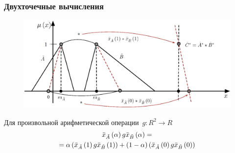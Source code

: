 \documentclass[12pt]{beamer}
\begin{document}
\begin{frame}
  \frametitle{Двухточечные вычисления}
  \begin{figure}[h]
    \includegraphics[width=\textwidth]{two-point}
  \end{figure}
  Для произвольной арифметической операции~$g: R^2 \rightarrow R$
  \begin{gather}
    \bar{x}_{\tilde A}\left( \alpha \right)g\bar{x}_{\tilde B}\left(\alpha \right)=\notag\\
    \label{eq:two-point-calculations}
    =\alpha \left(\bar{x}_{\tilde A}\left( 1 \right)g\bar{x}_{\tilde B}\left(1 \right) \right)+\left(1-\alpha \right)\left(\bar{x}_{\tilde A}\left(0 \right)g\bar{x}_{\tilde B}\left(0 \right) \right)
  \end{gather}
\end{frame}

\end{document}
